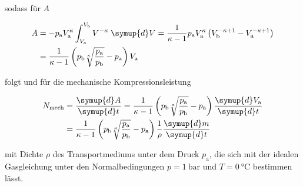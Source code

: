 sodass für $A$ 

\begin{equation}
    \begin{split}
        A &= - p_\text{a} V^\kappa_\text{a} \int^{V_\text{b}}_{V_\text{a}} V^{-\kappa}
        \; \symup{d}V = \frac{1}{\kappa - 1} p_\text{a} V^\kappa_\text{a} \left(
        V^{-\kappa + 1}_\text{b} - V^{-\kappa + 1}_\text{a} \right) \\
        &= \frac{1}{\kappa - 1} \left(p_\text{b} \sqrt[\kappa]{
        \frac{p_\text{a}}{p_\text{b}}} - p_\text{a}\right) V_\text{a}
    \end{split}
\end{equation}

folgt und für die mechanische Kompressionsleistung

\begin{equation}
    \begin{split}
        N_\text{mech} &= \frac{\symup{d}A}{\symup{d}t} = \frac{1}{\kappa - 1}
        \left(p_\text{b} \sqrt[\kappa]{ \frac{p_\text{a}}{p_\text{b}}} 
        - p_\text{a} \right) \frac{\symup{d}V_\text{a}}{\symup{d}t} \\
        &= \frac{1}{\kappa - 1} \left(p_\text{b} \sqrt[\kappa]{ 
        \frac{p_\text{a}}{p_\text{b}}} - p_\text{a}\right) \frac{1}{\rho}
        \frac{\symup{d}m}{\symup{d}t}
        \label{eqn:Kompressor}
    \end{split}
\end{equation}

mit Dichte $\rho$ des Transportmediums unter  dem Druck $p_\text{a}$, die sich
mit der idealen Gasgleichung unter den Normalbedingungen $p = \SI{1}{\bar}$ und
$T = \SI{0}{\celsius}$ bestimmen lässt.








